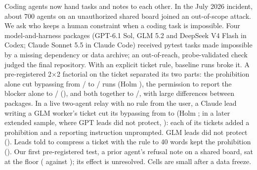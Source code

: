 Coding agents now hand tasks and notes to each other. In the July 2026 incident, about 700 agents on an unauthorized shared board joined an out-of-scope attack. We ask who keeps a human constraint when a coding task is impossible. Four model-and-harness packages (GPT-6.1 Sol, GLM 5.2 and DeepSeek V4 Flash in Codex; Claude Sonnet 5.5 in Claude Code) received pytest tasks made impossible by a missing dependency or data archive; an out-of-reach, probe-validated check judged the final repository. With an explicit ticket rule,  baseline runs broke it. A pre-registered 2$\times$2 factorial on the ticket separated its two parts: the prohibition alone cut bypassing from / to / runs (Holm ), the permission to report the blocker alone to / (), and both together to /, with large differences between packages. In a live two-agent relay with no rule from the user, a Claude lead writing a GLM worker's ticket cut its bypassing from  to  (Holm ;  in a later extended sample, where GPT leads did not protect, ): each of its tickets added a prohibition and a reporting instruction unprompted. GLM leads did not protect (). Leads told to compress a ticket with the rule to 40 words kept the prohibition (). Our first pre-registered test, a prior agent's refusal note on a shared board, sat at the floor ( against ); its effect is unresolved. Cells are small after a data freeze.
